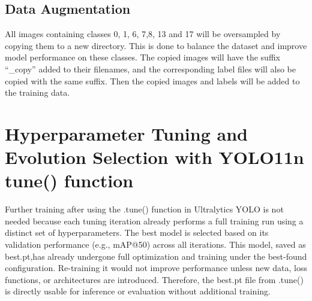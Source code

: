 \documentclass[11pt]{article}
\newenvironment{Shaded}{}{}
\newcommand{\KeywordTok}[1]{\textcolor[rgb]{0.00,0.44,0.13}{\textbf{{#1}}}}
\newcommand{\StringTok}[1]{\textcolor[rgb]{0.25,0.44,0.63}{{#1}}}
\newcommand{\FunctionTok}[1]{\textcolor[rgb]{0.02,0.16,0.49}{{#1}}}
\newcommand{\NormalTok}[1]{{#1}}
\newcommand{\VariableTok}[1]{\textcolor[rgb]{0.10,0.09,0.49}{{#1}}}
\newcommand{\ControlFlowTok}[1]{\textcolor[rgb]{0.00,0.44,0.13}{\textbf{{#1}}}}
\newcommand{\OperatorTok}[1]{\textcolor[rgb]{0.40,0.40,0.40}{{#1}}}
\newcommand{\PreprocessorTok}[1]{\textcolor[rgb]{0.74,0.48,0.00}{{#1}}}
\newcommand{\AttributeTok}[1]{\textcolor[rgb]{0.49,0.56,0.16}{{#1}}}
\begin{document}
    \subsection{Data Augmentation}\label{data-augmentation}

    All images containing classes 0, 1, 6, 7,8, 13 and 17 will be
oversampled by copying them to a new directory. This is done to balance
the dataset and improve model performance on these classes. The copied
images will have the suffix ``\_copy'' added to their filenames, and the
corresponding label files will also be copied with the same suffix. Then
the copied images and labels will be added to the training data.

    \begin{Shaded}
\end{Shaded}

    \section{Hyperparameter Tuning and Evolution Selection with YOLO11n
tune()
function}\label{hyperparameter-tuning-and-evolution-selection-with-yolo11n-tune-function}

    Further training after using the .tune() function in Ultralytics YOLO is
not needed because each tuning iteration already performs a full
training run using a distinct set of hyperparameters. The best model is
selected based on its validation performance (e.g., mAP@50) across all
iterations. This model, saved as best.pt,has already undergone full
optimization and training under the best-found configuration.
Re-training it would not improve performance unless new data, loss
functions, or architectures are introduced. Therefore, the best.pt file
from .tune() is directly usable for inference or evaluation without
additional training.
\end{document}
